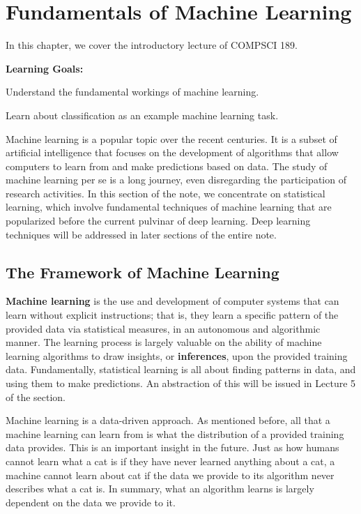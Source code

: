 \chapter{Fundamentals of Machine Learning}
In this chapter, we cover the introductory lecture of COMPSCI 189.

\textbf{Learning Goals:}
\begin{bindenum}
    \item Understand the fundamental workings of machine learning.
    \item Learn about classification as an example machine learning task.
\end{bindenum}

Machine learning is a popular topic over the recent centuries.
It is a subset of artificial intelligence that focuses on the development of algorithms that allow computers to learn from and make predictions based on data.
The study of machine learning per se is a long journey, even disregarding the participation of research activities.
In this section of the note, we concentrate on statistical learning, which involve fundamental techniques of machine learning that are popularized before the current pulvinar of deep learning.
Deep learning techniques will be addressed in later sections of the entire note.

\section{The Framework of Machine Learning}
\textbf{Machine learning} is the use and development of computer systems that can learn without explicit instructions; that is, they learn a specific pattern of the provided data via statistical measures, in an autonomous and algorithmic manner.
The learning process is largely valuable on the ability of machine learning algorithms to draw insights, or \textbf{inferences}, upon the provided training data.
Fundamentally, statistical learning is all about finding patterns in data, and using them to make predictions. An abstraction of this will be issued in Lecture 5 of the section.

Machine learning is a data-driven approach. As mentioned before, all that a machine learning can learn from is what the distribution of a provided training data provides.
This is an important insight in the future.
Just as how humans cannot learn what a cat is if they have never learned anything about a cat, a machine cannot learn about cat if the data we provide to its algorithm never describes what a cat is.
In summary, what an algorithm learns is largely dependent on the data we provide to it.

